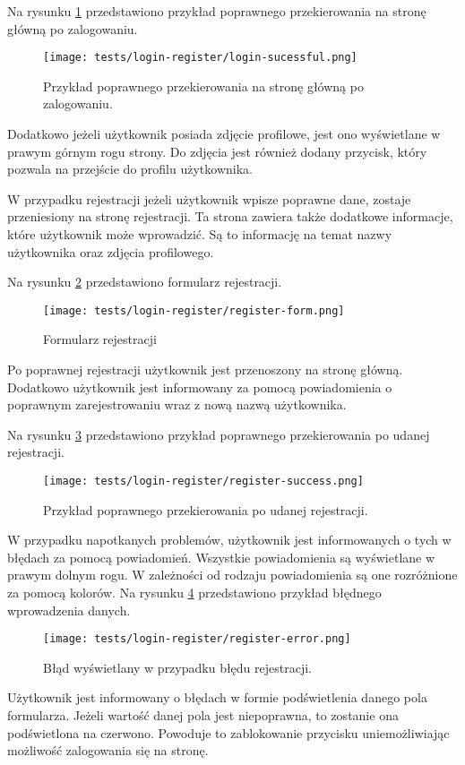 Na rysunku \ref{login_success} przedstawiono przykład poprawnego przekierowania na stronę główną po zalogowaniu. 
\begin{figure}[H]
  \centering
  \texttt{[image: tests/login-register/login-sucessful.png]}
  \caption{Przykład poprawnego przekierowania na stronę główną po zalogowaniu.}
  \label{login_success}
\end{figure}
Dodatkowo jeżeli użytkownik posiada zdjęcie profilowe, jest ono wyświetlane w prawym górnym rogu strony. Do zdjęcia jest również dodany przycisk, który pozwala na przejście do profilu użytkownika.

W przypadku rejestracji jeżeli użytkownik wpisze poprawne dane, zostaje przeniesiony na stronę rejestracji. Ta strona zawiera także dodatkowe informacje, które użytkownik może wprowadzić. Są to informację na temat nazwy użytkownika oraz zdjęcia profilowego.

Na rysunku \ref{register_page} przedstawiono formularz rejestracji.
\begin{figure}[H]
  \centering
  \texttt{[image: tests/login-register/register-form.png]}
  \caption{Formularz rejestracji}
  \label{register_page}
\end{figure}
Po poprawnej rejestracji użytkownik jest przenoszony na stronę główną. Dodatkowo użytkownik jest informowany za pomocą powiadomienia o poprawnym zarejestrowaniu wraz z nową nazwą użytkownika. 

Na rysunku \ref{success_register} przedstawiono przykład poprawnego przekierowania po udanej rejestracji.
\begin{figure}[H]
  \centering
  \texttt{[image: tests/login-register/register-success.png]}
  \caption{Przykład poprawnego przekierowania po udanej rejestracji.}
  \label{success_register}
\end{figure}
W przypadku napotkanych problemów, użytkownik jest informowanych o tych w błędach za pomocą powiadomień. Wszystkie powiadomienia są wyświetlane w prawym dolnym rogu. W zależności od rodzaju powiadomienia są one rozróżnione za pomocą kolorów. Na rysunku \ref{register_error} przedstawiono przykład błędnego wprowadzenia danych.
\begin{figure}[H]
  \centering
  \texttt{[image: tests/login-register/register-error.png]}
  \caption{Błąd wyświetlany w przypadku błędu rejestracji.}
  \label{register_error}
\end{figure}
Użytkownik jest informowany o błędach w formie podświetlenia danego pola formularza. Jeżeli wartość danej pola jest niepoprawna, to zostanie ona podświetlona na czerwono. Powoduje to zablokowanie przycisku uniemożliwiając możliwość zalogowania się na stronę.

